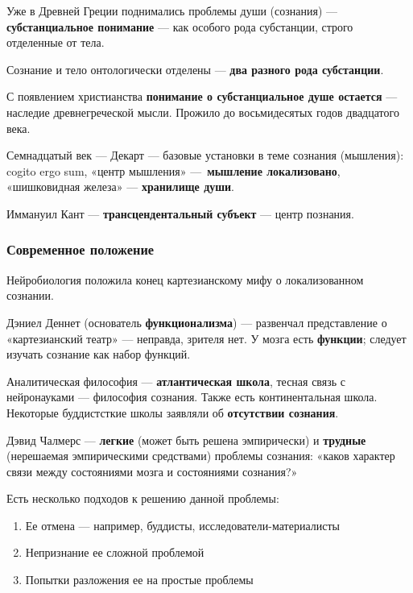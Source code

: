 \documentclass{article}
\begin{document}
\begin{flushleft}

Уже в Древней Греции поднимались проблемы души (сознания) — \textbf{субстанциальное понимание} — как особого рода субстанции, строго отделенные от тела.

Сознание и тело онтологически отделены — \textbf{два разного рода субстанции}.

С появлением христианства \textbf{понимание о субстанциальное душе остается} — наследие древнегреческой мысли. Прожило до восьмидесятых годов двадцатого века.

Семнадцатый век — Декарт — базовые установки в теме сознания (мышления): cogito ergo sum, «центр мышления» — \textbf{мышление локализовано}, «шишковидная железа» — \textbf{хранилище души}.

Иммануил Кант — \textbf{трансцендентальный субъект} — центр познания.

\subsubsection{Современное положение}

Нейробиология положила конец картезианскому мифу о локализованном сознании.

Дэниел Деннет (основатель \textbf{функционализма}) — развенчал представление о «картезианский театр» — неправда, зрителя нет. У мозга есть \textbf{функции}; следует изучать сознание как набор функций.

\hfill

Аналитическая философия — \textbf{атлантическая школа}, тесная связь с нейронауками — философия сознания. Также есть континентальная школа. Некоторые буддистсткие школы заявляли об \textbf{отсутствии сознания}.

Дэвид Чалмерс — \textbf{легкие} (может быть решена эмпирически) и \textbf{трудные} (нерешаемая эмпирическими средствами) проблемы сознания: «каков характер связи между состояниями мозга и состояниями сознания?»

Есть несколько подходов к решению данной проблемы:

\begin{enumerate}
    \item Ее отмена — например, буддисты, исследователи-материалисты
    \item Непризнание ее сложной проблемой
    \item Попытки разложения ее на простые проблемы
\end{enumerate}


\end{flushleft}
\end{document}
